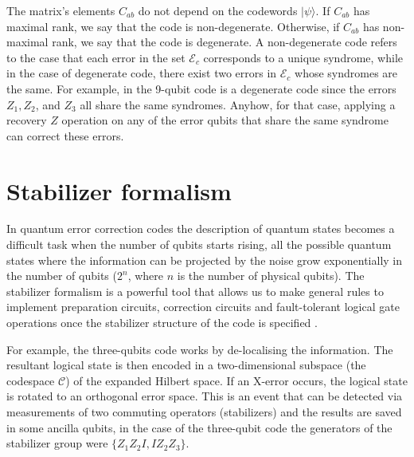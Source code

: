  The matrix's elements $C_{a b}$ do not depend on the codewords $|\psi\rangle$. %
If $C_{a b}$ has maximal rank, we say that the code is non-degenerate. Otherwise, if $C_{a b}$ has non-maximal rank, we say that the code is degenerate. A non-degenerate code refers to the case that each error in the set $\mathcal{E}_{c}$ corresponds to a unique syndrome, while in the case of degenerate code, there exist two errors in $\mathcal{E}_{c}$ whose syndromes are the same. For example, in the 9-qubit code is a degenerate code since the errors $Z_{1}, Z_{2}$, and $Z_{3}$ all share the same syndromes. Anyhow, for that case, applying a recovery $Z$ operation on any of the error qubits that share the same syndrome can correct these errors.






\section{Stabilizer formalism}
In quantum error correction codes the description of quantum states becomes a difficult task when the number of qubits starts rising, all the possible quantum states where the information can be projected by the noise grow exponentially in the number of qubits ($2^n$, where $n$ is the number of physical qubits).
The stabilizer formalism is a powerful tool that allows us to make general rules to implement preparation circuits, correction circuits and fault-tolerant logical gate operations once the stabilizer structure of the code is specified \cite{DanielGottesman} \cite{gottesman1997stabilizer}.


For example, the three-qubits code works by de-localising the information. The resultant logical state is then encoded in a two-dimensional subspace (the codespace $\mathcal{C}$) of the expanded Hilbert space. If an X-error occurs, the logical state is rotated to an orthogonal error space. This is an event that can be detected via measurements of two commuting operators (stabilizers) and the results are saved in some ancilla qubits, in the case of the three-qubit code the generators of the stabilizer group were $\{Z_1 Z_2 I, I Z_2 Z_3 \}$. 



